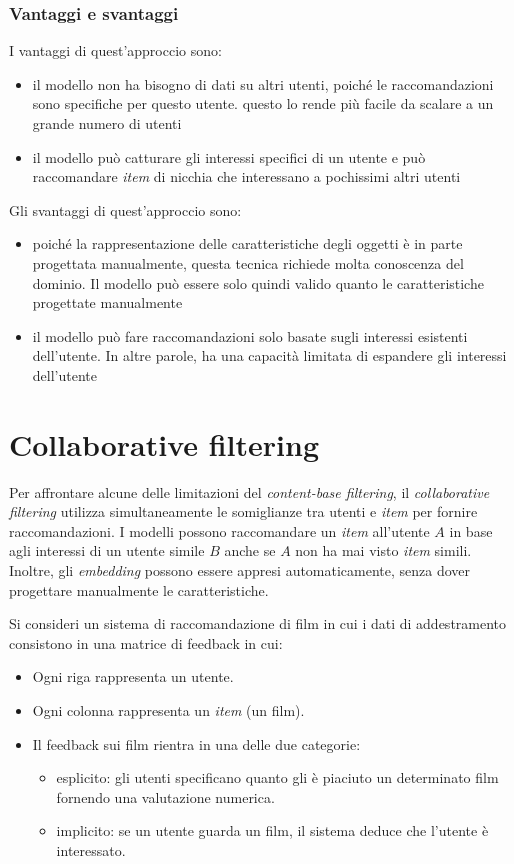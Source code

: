 \subsubsection{Vantaggi e svantaggi}

I vantaggi di quest'approccio sono:
\begin{itemize}
    \item il modello non ha bisogno di dati su altri utenti, poiché le raccomandazioni sono specifiche per questo utente. questo lo rende più facile da scalare a un grande numero di utenti
    \item il modello può catturare gli interessi specifici di un utente e può raccomandare \textit{item} di nicchia che interessano a pochissimi altri utenti
\end{itemize}

Gli svantaggi di quest'approccio sono:
\begin{itemize}
    \item poiché la rappresentazione delle caratteristiche degli oggetti è in parte progettata manualmente, questa tecnica richiede molta conoscenza del dominio. Il modello può essere solo quindi valido quanto le caratteristiche progettate manualmente
    \item il modello può fare raccomandazioni solo basate sugli interessi esistenti dell'utente. In altre parole, ha una capacità limitata di espandere gli interessi dell'utente
\end{itemize}

\section{Collaborative filtering}

Per affrontare alcune delle limitazioni del \textit{content-base filtering}, il \textit{collaborative filtering} utilizza simultaneamente le somiglianze tra utenti e \textit{item} per fornire raccomandazioni. I modelli possono raccomandare un \textit{item} all’utente $A$ in base agli interessi di un utente simile $B$ anche se $A$ non ha mai visto \textit{item} simili. Inoltre, gli \textit{embedding} possono essere appresi automaticamente, senza dover progettare manualmente le caratteristiche.

Si consideri un sistema di raccomandazione di film in cui i dati di addestramento consistono in una matrice di feedback in cui:

\begin{itemize}
    \item Ogni riga rappresenta un utente.
    \item Ogni colonna rappresenta un \textit{item} (un film).
    \item Il feedback sui film rientra in una delle due categorie:
    \begin{itemize}
        \item esplicito: gli utenti specificano quanto gli è piaciuto un determinato film fornendo una valutazione numerica.
        \item implicito: se un utente guarda un film, il sistema deduce che l'utente è interessato.
    \end{itemize}
\end{itemize}

